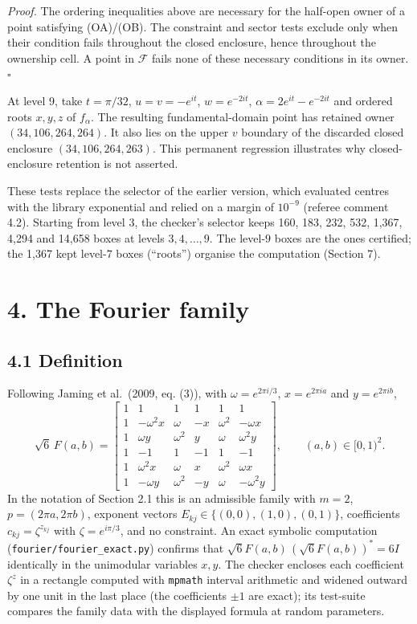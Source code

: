 \documentclass[
  11pt,
]{article}
\newcounter{none} %
\begin{document}
\emph{Proof.} The ordering inequalities above are necessary for the
half-open owner of a point satisfying (OA)/(OB). The constraint and
sector tests exclude only when their condition fails throughout the
closed enclosure, hence throughout the ownership cell. A point in
\(\mathcal F\) fails none of these necessary conditions in its owner.
\(\square\)

At level 9, take \(t=\pi/32\), \(u=v=-e^{it}\), \(w=e^{-2it}\),
\(\alpha=2e^{it}-e^{-2it}\) and ordered roots \(x,y,z\) of \(f_\alpha\).
The resulting fundamental-domain point has retained owner
\((34,106,264,264)\). It also lies on the upper \(v\) boundary of the
discarded closed enclosure \((34,106,264,263)\). This permanent
regression illustrates why closed-enclosure retention is not asserted.

These tests replace the selector of the earlier version, which evaluated
centres with the library exponential and relied on a margin of
\(10^{-9}\) (referee comment 4.2). Starting from level \(3\), the
checker's selector keeps 160, 183, 232, 532, 1,367, 4,294 and 14,658
boxes at levels \(3,4,\dots,9\). The level-\(9\) boxes are the ones
certified; the 1,367 kept level-\(7\) boxes (``roots'') organise the
computation (Section 7).

\section{4. The Fourier family}\label{the-fourier-family}

\subsection{4.1 Definition}\label{definition}

Following Jaming et al.~(2009, eq. (3)), with \(\omega=e^{2\pi i/3}\),
\(x=e^{2\pi ia}\) and \(y=e^{2\pi ib}\), \[
\sqrt6\,F(a,b)=\begin{bmatrix}
1&1&1&1&1&1\\
1&-\omega^2x&\omega&-x&\omega^2&-\omega x\\
1&\omega y&\omega^2&y&\omega&\omega^2y\\
1&-1&1&-1&1&-1\\
1&\omega^2x&\omega&x&\omega^2&\omega x\\
1&-\omega y&\omega^2&-y&\omega&-\omega^2y
\end{bmatrix},\qquad (a,b)\in[0,1)^2 .
\] In the notation of Section 2.1 this is an admissible family with
\(m=2\), \(p=(2\pi a,2\pi b)\), exponent vectors
\(E_{kj}\in\{(0,0),(1,0),(0,1)\}\), coefficients
\(c_{kj}=\zeta^{z_{kj}}\) with \(\zeta=e^{i\pi/3}\), and no constraint.
An exact symbolic computation (\texttt{fourier/fourier\_exact.py})
confirms that \(\sqrt6F(a,b)\,(\sqrt6F(a,b))^*=6I\) identically in the
unimodular variables \(x,y\). The checker encloses each coefficient
\(\zeta^{z}\) in a rectangle computed with \texttt{mpmath} interval
arithmetic and widened outward by one unit in the last place (the
coefficients \(\pm1\) are exact); its test-suite compares the family
data with the displayed formula at random parameters.
\end{document}
